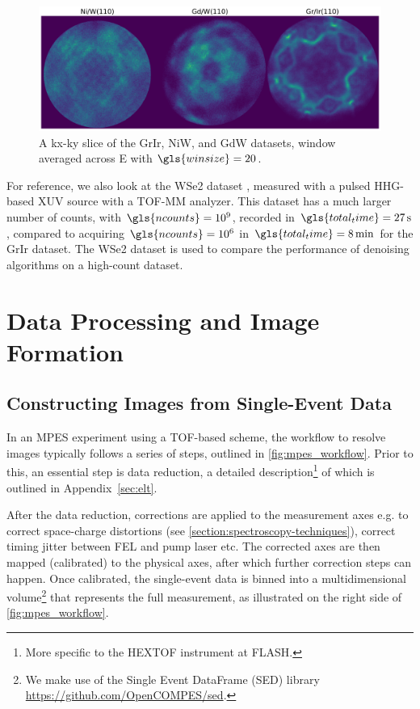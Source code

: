 \begin{figure}[h]
    \centering
    \includegraphics[width=1\linewidth]{images/datasets_3_kx_ky.pdf}
    \caption{A \gls{kx}-\gls{ky} slice of the \gls{GrIr}, \gls{NiW}, and \gls{GdW} datasets, window averaged across \gls{E} with $\gls{winsize}=\num{20}$.}
    \label{fig:all-hextof-datasets-kxky}
\end{figure}

For reference, we also look at the \gls{WSe2} dataset \cite{maklarTimeresolvedARPESRAW2022}, measured with a pulsed \gls{HHG}-based \gls{XUV} source with a \gls{TOF}-\gls{MM} analyzer. This dataset has a much larger number of counts, with $\gls{ncounts}=\num{e9}$, recorded in $\gls{total_time}=\qty{27}{s}$, compared to acquiring $\gls{ncounts}=\num{e6}$ in $\gls{total_time}=\qty{8}{\min}$ for the \gls{GrIr} dataset. The \gls{WSe2} dataset is used to compare the performance of denoising algorithms on a high-count dataset.

\section{Data Processing and Image Formation}
\subsection{Constructing Images from Single-Event Data}
In an \gls{MPES} experiment using a \gls{TOF}-based scheme, the workflow to resolve images typically follows a series of steps, outlined in \cref{fig:mpes_workflow}. Prior to this, an essential step is data reduction, a detailed description\footnote{More specific to the \gls{HEXTOF} instrument at \gls{FLASH}.} of which is outlined in Appendix~\ref{sec:elt}.

After the data reduction, corrections are applied to the measurement axes e.g. to correct space-charge distortions (see \cref{section:spectroscopy-techniques}), correct timing jitter between \gls{FEL} and pump laser etc. The corrected axes are then mapped (calibrated) to the physical axes, after which further correction steps can happen. Once calibrated, the single-event data is binned into a multidimensional volume\footnote{We make use of the Single Event DataFrame (SED) library \href{https://github.com/OpenCOMPES/sed}{https://github.com/OpenCOMPES/sed}.} that represents the full measurement, as illustrated on the right side of \cref{fig:mpes_workflow}.

